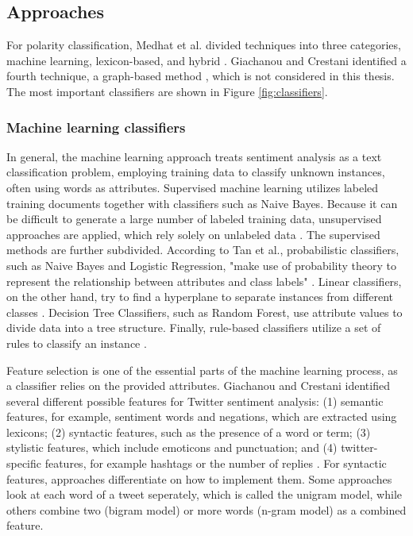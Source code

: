 \subsection{Approaches}
For polarity classification, Medhat et al. divided techniques into three categories, machine learning, lexicon-based, and hybrid \cite{MEDHAT20141093}. Giachanou and Crestani identified a fourth technique, a graph-based method \cite{DBLP:journals/csur/GiachanouC16}, which is not considered in this thesis. The most important classifiers are shown in Figure \ref{fig:classifiers}. 

\subsubsection{Machine learning classifiers}
\label{sub:fund_mach}
In general, the machine learning approach treats sentiment analysis as a text classification problem, employing training data to classify unknown instances, often using words as attributes. Supervised machine learning utilizes labeled training documents together with classifiers such as Naive Bayes. Because it can be difficult to generate a large number of labeled training data, unsupervised approaches are applied, which rely solely on unlabeled data \cite{MEDHAT20141093}. The supervised methods are further subdivided. According to Tan et al., probabilistic classifiers, such as Naive Bayes and Logistic Regression, "make use of probability theory to represent the relationship between attributes and class labels" \cite[p.~414]{DBLP:books/aw/TanSKK2019}. Linear classifiers, on the other hand, try to find a hyperplane to separate instances from different classes \cite{MEDHAT20141093}. Decision Tree Classifiers, such as Random Forest, use attribute values to divide data into a tree structure. Finally, rule-based classifiers utilize a set of rules to classify an instance \cite{DBLP:books/aw/TanSKK2019}.

Feature selection is one of the essential parts of the machine learning process, as a classifier relies on the provided attributes. Giachanou and Crestani identified several different possible features for Twitter sentiment analysis: (1) semantic features, for example, sentiment words and negations, which are extracted using lexicons; (2) syntactic features, such as the presence of a word or term; (3) stylistic features, which include emoticons and punctuation; and (4) twitter-specific features, for example hashtags or the number of replies \cite{DBLP:journals/csur/GiachanouC16}. For syntactic features, approaches differentiate on how to implement them. Some approaches look at each word of a tweet seperately, which is called the unigram model, while others combine two (bigram model) or more words (n-gram model) as a combined feature.

